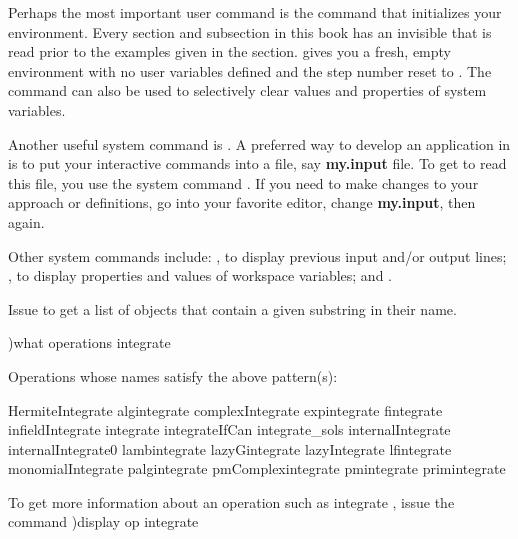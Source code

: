 {{{{{{{{Perhaps the most important user command is the 
command that initializes your environment.
Every section and subsection in this book has an invisible
 that is read prior to the examples given in
the section.
 gives you a fresh, empty environment with no
user variables defined and the step number reset to .
The  command can also be used to selectively clear
values and properties of system variables.

Another useful system command is .
A preferred way to develop an application in \Language{} is to put
your interactive commands into a file, say {\bf my.input} file.
To get \Language{} to read this file, you use the system command
.
If you need to make changes to your approach or definitions, go
into your favorite editor, change {\bf my.input}, then
 again.

Other system commands include: , to display
previous input and/or output lines; , to display
properties and values of workspace variables; and .

\begin{xtc}
\begin{xtccomment}
Issue  to get a list of \Language{} objects that
contain a given substring in their name.
\end{xtccomment}
\begin{spadsrc}
)what operations integrate
\end{spadsrc}
\begin{SysCmdOutput}

Operations whose names satisfy the above pattern(s):

HermiteIntegrate      algintegrate          complexIntegrate      
expintegrate          fintegrate            infieldIntegrate      
integrate             integrateIfCan        integrate_sols        
internalIntegrate     internalIntegrate0    lambintegrate         
lazyGintegrate        lazyIntegrate         lfintegrate           
monomialIntegrate     palgintegrate         pmComplexintegrate    
pmintegrate           primintegrate         
   
      To get more information about an operation such as integrate , 
      issue the command )display op integrate 
\end{SysCmdOutput}
\end{xtc}


}}}}}}}}
